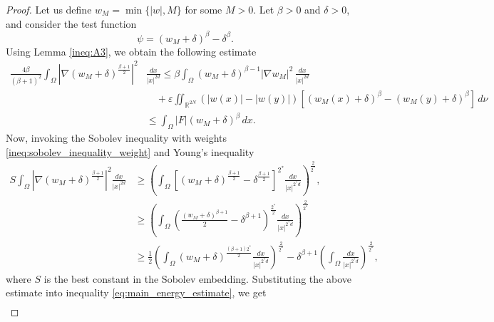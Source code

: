 \documentclass[11pt]{article}
\newcommand{\om} {\Omega}
\newcommand{\grad}{\nabla}
\begin{document}
\begin{proof}
Let us define \( w_M = \min\{ |w|, M \} \) for some \( M > 0 \). Let \( \beta > 0 \) and \( \delta > 0 \), and consider the test function
\begin{equation*}
    \psi = (w_M + \delta)^\beta - \delta^\beta.
\end{equation*}
Using Lemma \eqref{ineq:A3}, we obtain the following estimate
\begin{equation}
\begin{aligned}
    \frac{4\beta}{(\beta + 1)^2} \int_{\om}  | \grad  (w_M + \delta)^{\frac{\beta + 1}{2}}|^2 &\frac{dx}{|x|^{2d}} 
    \leq 
    \beta \int_\Omega (w_M + \delta)^{\beta - 1} |\nabla w_M|^2 \, \frac{dx}{|x|^{2d}} \\
    &\quad + \varepsilon \iint_{\mathbb{R}^{2N}} (|w(x)| - |w(y)|) \left[ (w_M(x) + \delta)^\beta - (w_M(y) + \delta)^\beta \right] \, d\nu \\
    &\leq \int_\Omega |F| (w_M + \delta)^\beta \, dx.
\end{aligned}
\label{eq:main_energy_estimate}
\end{equation}
Now, invoking the Sobolev inequality with weights \eqref{ineq:sobolev_inequality_weight} and Young's inequality
\begin{equation*}
\begin{aligned}
S\int_{\om}  | \grad  (w_M + \delta)^{\frac{\beta + 1}{2}}|^2 \frac{dx}{|x|^{2d}} 
&\geq 
\left( \int_\Omega \left[ (w_M + \delta)^{\frac{\beta + 1}{2}} - \delta^{\frac{\beta + 1}{2}} \right]^{2^*} \frac{dx}{|x|^{ 2^* d}} \right)^{\frac{2}{2^*}}, \\
    &\geq  \left( \int_\Omega \left( \frac{(w_M + \delta)^{\beta + 1}}{2} - \delta^{{\beta + 1}} \right)^{\frac{2^*}{2}} \frac{dx}{|x|^{2^* d}} \right)^{\frac{2}{2^*}} \\
    &\geq \frac{1}{2} \left( \int_\Omega (w_M + \delta)^{\frac{(\beta + 1) 2^*}{2}} \frac{dx}{|x|^{2^* d}} \right)^{\frac{2}{2^*}} - \delta^{{\beta + 1}} \left( \int_\Omega \frac{dx}{|x|^{ 2^* d}} \right)^{\frac{2}{2^*}},
\end{aligned}
\end{equation*}
where \( S \) is the best constant in the Sobolev embedding.
Substituting the above estimate into inequality \eqref{eq:main_energy_estimate}, we get
\begin{equation}
\begin{aligned}

\end{aligned}
\end{equation}
\end{proof}
\end{document}
